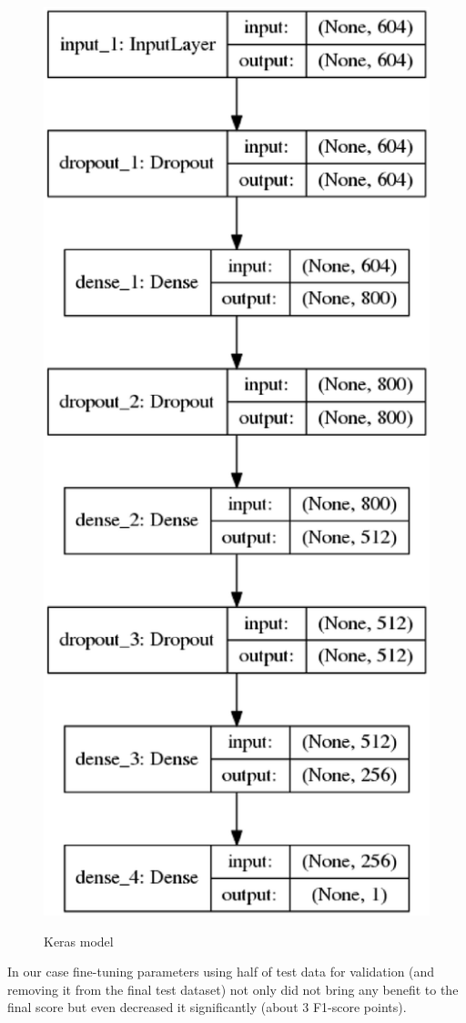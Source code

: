 \documentclass[11pt,a4paper]{article}
\begin{document}
\begin{figure}[!htbp]
	
	\centering
	\small
	\includegraphics[scale=0.3]{keras_model}\\
	
	\caption{Keras model}
	\label{keras_model}
\end{figure}
In our case fine-tuning parameters using half of test data for validation (and removing it from the final test dataset) not only did not bring any benefit to the final score but even decreased it significantly (about 3 F1-score points).
\end{document}
